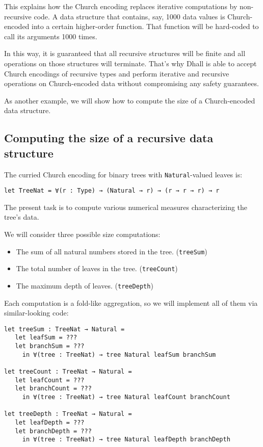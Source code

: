 This explains how the Church encoding replaces iterative computations by non-recursive code.
A data structure that contains, say, 1000 data values is Church-encoded into a certain higher-order function.
That function will be hard-coded to call its arguments 1000 times.


In this way, it is guaranteed that all recursive structures will be finite and all operations on those structures will terminate.
That's why Dhall is able to accept Church encodings of recursive types and perform iterative and recursive operations on Church-encoded data without compromising any safety guarantees.


As another example, we will show how to compute the size of a Church-encoded data structure.


\subsection{Computing the size of a recursive data structure}


The curried Church encoding for binary trees with \lstinline!Natural!-valued leaves is:


\begin{lstlisting}[language=Dhall]
let TreeNat = ∀(r : Type) → (Natural → r) → (r → r → r) → r
\end{lstlisting}


The present task is to compute various numerical measures characterizing the tree's data.


We will consider three possible size computations:


\begin{itemize}
\item{The sum of all natural numbers stored in the tree. (\lstinline!treeSum!)}
\item{The total number of leaves in the tree. (\lstinline!treeCount!)}
\item{The maximum depth of leaves. (\lstinline!treeDepth!)}
\end{itemize}
Each computation is a fold-like aggregation, so we will implement all of them via similar-looking code:


\begin{lstlisting}[language=Dhall]
let treeSum : TreeNat → Natural =
   let leafSum = ???
   let branchSum = ???
     in ∀(tree : TreeNat) → tree Natural leafSum branchSum

let treeCount : TreeNat → Natural =
   let leafCount = ???
   let branchCount = ???
     in ∀(tree : TreeNat) → tree Natural leafCount branchCount

let treeDepth : TreeNat → Natural =
   let leafDepth = ???
   let branchDepth = ???
     in ∀(tree : TreeNat) → tree Natural leafDepth branchDepth
\end{lstlisting}


